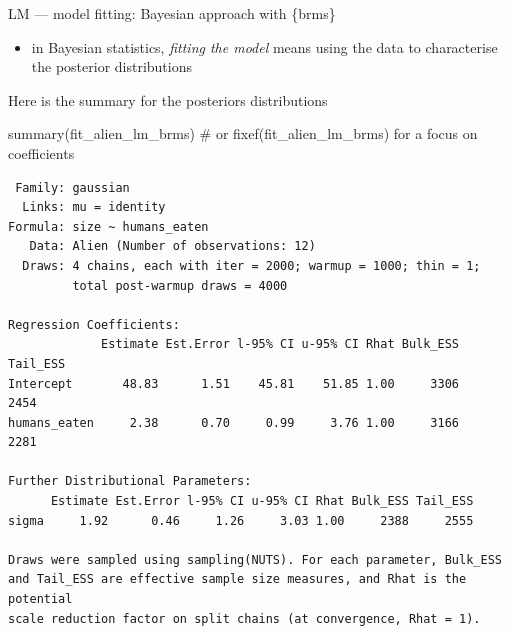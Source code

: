 \documentclass[
  10pt,
  ignorenonframetext,
  aspectratio=169,
  t]{beamer}
\newenvironment{Shaded}{\begin{snugshade}}{\end{snugshade}}
\newcommand{\CommentTok}[1]{\textcolor[rgb]{0.37,0.37,0.37}{#1}}
\newcommand{\FunctionTok}[1]{\textcolor[rgb]{0.28,0.35,0.67}{#1}}
\newcommand{\NormalTok}[1]{\textcolor[rgb]{0.00,0.23,0.31}{#1}}
\providecommand{\tightlist}{%
  \setlength{\itemsep}{0pt}\setlength{\parskip}{0pt}}
\newcommand{\blueit}[1]{\textcolor{bluebeamer}{\emph{#1}}}
\begin{document}
\begin{frame}[fragile]{LM --- model fitting: Bayesian approach with
\{brms\}}
\protect{}\label{lm-model-fitting-bayesian-approach-with-brms-2}
\begin{itemize}
\tightlist
\item
  in Bayesian statistics, \blueit{fitting the model} means using the
  data to characterise the posterior distributions
\end{itemize}

Here is the summary for the posteriors distributions

\scriptsize

\begin{Shaded}
\begin{Highlighting}[]
\FunctionTok{summary}\NormalTok{(fit\_alien\_lm\_brms) }\CommentTok{\# or fixef(fit\_alien\_lm\_brms) for a focus on coefficients}
\end{Highlighting}
\end{Shaded}

\begin{verbatim}
 Family: gaussian 
  Links: mu = identity 
Formula: size ~ humans_eaten 
   Data: Alien (Number of observations: 12) 
  Draws: 4 chains, each with iter = 2000; warmup = 1000; thin = 1;
         total post-warmup draws = 4000

Regression Coefficients:
             Estimate Est.Error l-95% CI u-95% CI Rhat Bulk_ESS Tail_ESS
Intercept       48.83      1.51    45.81    51.85 1.00     3306     2454
humans_eaten     2.38      0.70     0.99     3.76 1.00     3166     2281

Further Distributional Parameters:
      Estimate Est.Error l-95% CI u-95% CI Rhat Bulk_ESS Tail_ESS
sigma     1.92      0.46     1.26     3.03 1.00     2388     2555

Draws were sampled using sampling(NUTS). For each parameter, Bulk_ESS
and Tail_ESS are effective sample size measures, and Rhat is the potential
scale reduction factor on split chains (at convergence, Rhat = 1).
\end{verbatim}

\normalsize
\end{frame}
\end{document}
